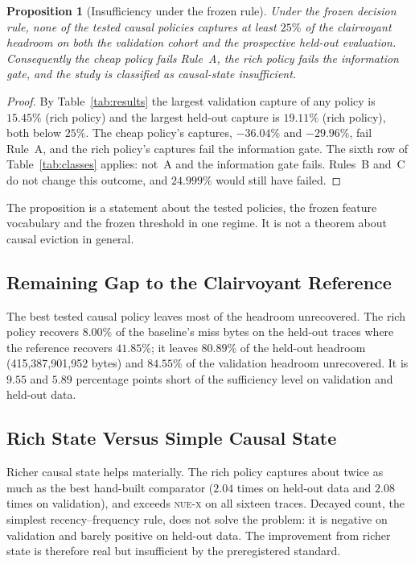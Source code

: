 \documentclass[11pt]{article}
\theoremstyle{plain}
\newtheorem{proposition}{Proposition}
\theoremstyle{definition}
\newcommand{\nuex}{\textsc{nue-x}}
\begin{document}
\begin{proposition}[Insufficiency under the frozen rule]
\label{prop:main}
Under the frozen decision rule, none of the tested causal policies captures at least $25\%$ of the clairvoyant headroom on both the validation cohort and the prospective held-out evaluation. Consequently the cheap policy fails Rule~A, the rich policy fails the information gate, and the study is classified as causal-state insufficient.
\end{proposition}
\begin{proof}
By Table~\ref{tab:results} the largest validation capture of any policy is $15.45\%$ (rich policy) and the largest held-out capture is $19.11\%$ (rich policy), both below $25\%$. The cheap policy's captures, $-36.04\%$ and $-29.96\%$, fail Rule~A, and the rich policy's captures fail the information gate. The sixth row of Table~\ref{tab:classes} applies: not~A and the information gate fails. Rules~B and~C do not change this outcome, and $24.999\%$ would still have failed.
\end{proof}
The proposition is a statement about the tested policies, the frozen feature vocabulary and the frozen threshold in one regime. It is not a theorem about causal eviction in general.

\subsection{Remaining Gap to the Clairvoyant Reference}
\label{sec:gap}
The best tested causal policy leaves most of the headroom unrecovered. The rich policy recovers $8.00\%$ of the baseline's miss bytes on the held-out traces where the reference recovers $41.85\%$; it leaves $80.89\%$ of the held-out headroom (415{,}387{,}901{,}952 bytes) and $84.55\%$ of the validation headroom unrecovered. It is $9.55$ and $5.89$ percentage points short of the sufficiency level on validation and held-out data.

\subsection{Rich State Versus Simple Causal State}
\label{sec:richsimple}
Richer causal state helps materially. The rich policy captures about twice as much as the best hand-built comparator ($2.04$ times on held-out data and $2.08$ times on validation), and exceeds \nuex{} on all sixteen traces. Decayed count, the simplest recency--frequency rule, does not solve the problem: it is negative on validation and barely positive on held-out data. The improvement from richer state is therefore real but insufficient by the preregistered standard.
\end{document}

